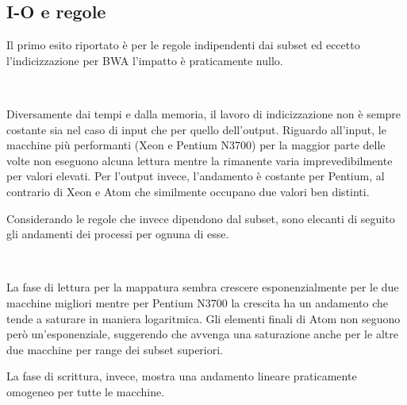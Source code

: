 \subsection{I-O e regole}
Il primo esito riportato è per le regole indipendenti dai subset ed eccetto l'indicizzazione per BWA l'impatto è praticamente nullo.
\begin{figure}[H]
\centering
{} \quad
{} \\
\caption{}
\label{fig:RSSrng}
\end{figure}
Diversamente dai tempi e dalla memoria, il lavoro di indicizzazione non è sempre costante sia nel caso di input che per quello dell'output.
Riguardo all'input, le macchine più performanti (Xeon e Pentium N3700) per la maggior parte delle volte non eseguono alcuna lettura mentre la rimanente varia imprevedibilmente per valori elevati.
Per l'output invece, l'andamento è costante per Pentium, al contrario di Xeon e Atom che similmente occupano due valori ben distinti. 


Considerando le regole che invece dipendono dal subset, sono elecanti di seguito gli andamenti dei processi per ognuna di esse.
\begin{figure}[H]
\centering
{} \quad
{} \\
\caption{}
\label{fig:IOm}
\end{figure}

La fase di lettura per la mappatura sembra crescere esponenzialmente per le due macchine migliori mentre per Pentium N3700 la crescita ha un andamento che tende a saturare in maniera logaritmica. 
Gli elementi finali di Atom non seguono però un'esponenziale, suggerendo che avvenga una saturazione anche per le altre due macchine per range dei subset superiori.

La fase di scrittura, invece, mostra una andamento lineare praticamente omogeneo per tutte le macchine.  

\begin{figure}[H]
\centering
{} \quad
{} \\
\caption{}
\label{fig:IOSp}
\end{figure}

